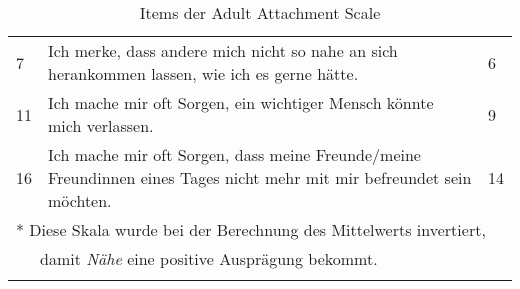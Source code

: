 \begin{table}[htbp]
\begin{tabular}{|p{2em} m{30em}  l|}
  7 & Ich merke, dass andere mich nicht so nahe an sich herankommen lassen, wie ich es gerne hätte. & 6 \\
  11 & Ich mache mir oft Sorgen, ein wichtiger Mensch könnte mich verlassen. & 9 \\
  16 & Ich mache mir oft Sorgen, dass meine Freunde/meine Freundinnen eines Tages nicht mehr mit mir befreundet sein möchten. & 14 \\
  \hline
  \multicolumn{3}{l}{* Diese Skala wurde bei der Berechnung des Mittelwerts invertiert,}\\
  \multicolumn{3}{l}{~~~damit \textit{Nähe} eine positive Ausprägung bekommt.}\\
  \multicolumn{3}{l}{}\\
\end{tabular}
\caption{Items der Adult Attachment Scale}
\label{table:AAS}
\end{table}
